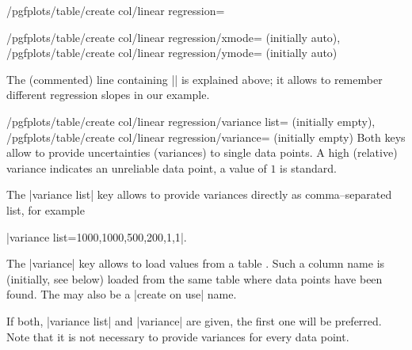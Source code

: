 {\begin{stylekey}{/pgfplots/table/create col/linear regression=}
\begin{keylist}{%
		/pgfplots/table/create col/linear regression/xmode= (initially auto),
		/pgfplots/table/create col/linear regression/ymode= (initially auto)}
\begin{codeexample}[]
\end{codeexample}

	The (commented) line containing |\slope| is explained above; it allows to remember different regression slopes in our example.
	\end{keylist}

	\begin{keylist}{%
		/pgfplots/table/create col/linear regression/variance list= (initially empty),%
		/pgfplots/table/create col/linear regression/variance= (initially empty)%
	}
	Both keys allow to provide uncertainties (variances) to single data points. 
	A high (relative) variance indicates an unreliable data point, a value of $1$ is standard.

	The |variance list| key allows to provide variances directly as comma--separated list, for example

	|variance list={1000,1000,500,200,1,1}|.

	The |variance| key allows to load values from a table . Such a column name is (initially, see below) loaded from the same table where data points have been found. The  may also be a |create on use| name.
\begin{codeexample}[]
\end{codeexample}

	If both, |variance list| and |variance| are given, the first one will be preferred. Note that it is not necessary to provide variances for every data point.
	\end{keylist}


\end{stylekey}}
